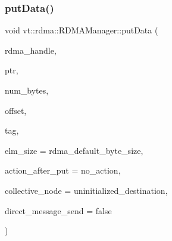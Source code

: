 \mbox{\label{structvt_1_1rdma_1_1_r_d_m_a_manager_a839c0031a48c5341494b119b0f10bafa}} 
\subsubsection{\texorpdfstring{put\+Data()}{putData()}\hspace{0.1cm}{\footnotesize\ttfamily [2/2]}}
{\footnotesize\ttfamily void vt\+::rdma\+::\+R\+D\+M\+A\+Manager\+::put\+Data (\begin{DoxyParamCaption}\item[{\hyperlink{namespacevt_a10442579ec4e7ebef223818e64bcf908}{R\+D\+M\+A\+\_\+\+Handle\+Type} const \&}]{rdma\+\_\+handle,  }\item[{\hyperlink{namespacevt_a9e2c953286c7616f7c218e9951790776}{R\+D\+M\+A\+\_\+\+Ptr\+Type} const \&}]{ptr,  }\item[{\hyperlink{namespacevt_aab8d55968084610ce3b17057981e9300}{Byte\+Type} const \&}]{num\+\_\+bytes,  }\item[{\hyperlink{namespacevt_aab8d55968084610ce3b17057981e9300}{Byte\+Type} const \&}]{offset,  }\item[{\hyperlink{namespacevt_a84ab281dae04a52a4b243d6bf62d0e52}{Tag\+Type} const \&}]{tag,  }\item[{\hyperlink{namespacevt_aab8d55968084610ce3b17057981e9300}{Byte\+Type} const \&}]{elm\+\_\+size = {\ttfamily rdma\+\_\+default\+\_\+byte\+\_\+size},  }\item[{\hyperlink{namespacevt_ae0a5a7b18cc99d7b732cb4d44f46b0f3}{Action\+Type}}]{action\+\_\+after\+\_\+put = {\ttfamily no\+\_\+action},  }\item[{\hyperlink{namespacevt_a866da9d0efc19c0a1ce79e9e492f47e2}{Node\+Type} const \&}]{collective\+\_\+node = {\ttfamily uninitialized\+\_\+destination},  }\item[{bool const}]{direct\+\_\+message\+\_\+send = {\ttfamily false} }\end{DoxyParamCaption})}

\mbox{\label{structvt_1_1rdma_1_1_r_d_m_a_manager_a9f5bbbbdc2d6cca20f3bd5a259ecaf62}} 
